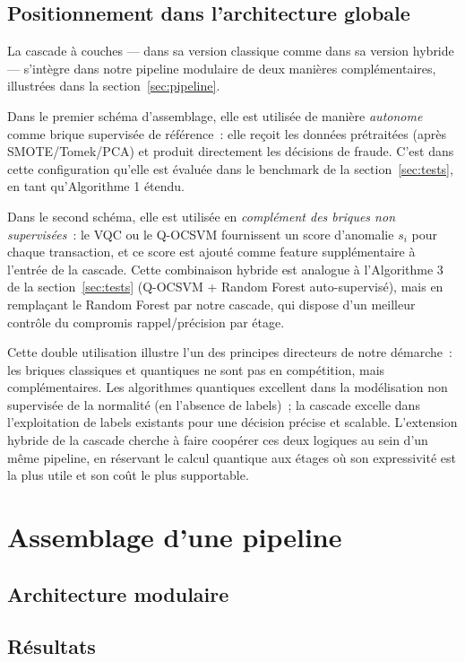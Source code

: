 \documentclass[a4paper]{article}
\begin{document}
\subsection{Positionnement dans l'architecture globale}
 
La cascade à couches --- dans sa version classique comme dans sa version hybride --- s'intègre dans notre pipeline modulaire de deux manières complémentaires, illustrées dans la section~\ref{sec:pipeline}.
 
Dans le premier schéma d'assemblage, elle est utilisée de manière \emph{autonome} comme brique supervisée de référence~: elle reçoit les données prétraitées (après SMOTE/Tomek/PCA) et produit directement les décisions de fraude. C'est dans cette configuration qu'elle est évaluée dans le benchmark de la section~\ref{sec:tests}, en tant qu'Algorithme 1 étendu.
 
Dans le second schéma, elle est utilisée en \emph{complément des briques non supervisées}~: le VQC ou le Q-OCSVM fournissent un score d'anomalie $s_i$ pour chaque transaction, et ce score est ajouté comme feature supplémentaire à l'entrée de la cascade. Cette combinaison hybride est analogue à l'Algorithme 3 de la section~\ref{sec:tests} (Q-OCSVM + Random Forest auto-supervisé), mais en remplaçant le Random Forest par notre cascade, qui dispose d'un meilleur contrôle du compromis rappel/précision par étage.
 
Cette double utilisation illustre l'un des principes directeurs de notre démarche~: les briques classiques et quantiques ne sont pas en compétition, mais complémentaires. Les algorithmes quantiques excellent dans la modélisation non supervisée de la normalité (en l'absence de labels)~; la cascade excelle dans l'exploitation de labels existants pour une décision précise et scalable. L'extension hybride de la cascade cherche à faire coopérer ces deux logiques au sein d'un même pipeline, en réservant le calcul quantique aux étages où son expressivité est la plus utile et son coût le plus supportable.

\section{Assemblage d'une pipeline}

\subsection{Architecture modulaire}

\subsection{Résultats}
\end{document}
